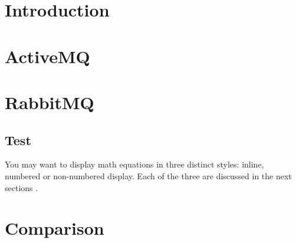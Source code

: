 \section{Introduction}


\section{ActiveMQ}

\section{RabbitMQ}


\subsection{Test}
You may want to display math equations in three distinct styles:
inline, numbered or non-numbered display.  Each of
the three are discussed in the next sections \cite{Toshev2015}.

\section{Comparison}

